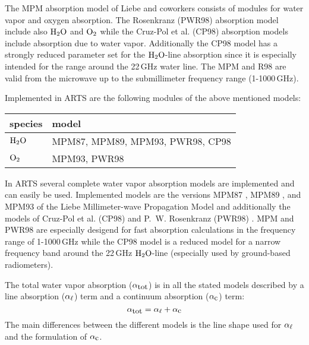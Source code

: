 {%



\label{levelb:CompAbsMod}
The MPM absorption model of Liebe and coworkers consists of modules for 
water vapor and oxygen absorption. The Rosenkranz (PWR98) absorption 
model include also $\mbox{H}_2\mbox{O}$ and $\mbox{O}_2$ while the Cruz-Pol et al. (CP98) absorption 
models include absorption due to water vapor. Additionally 
the CP98 model has a strongly reduced parameter set for the $\mbox{H}_2\mbox{O}$-line 
absorption since it is especially intended for the range around the 
22\,GHz water line. The MPM and R98 are valid from the microwave 
up to the submillimeter frequency range (1-1000\,GHz).

Implemented in ARTS are the following modules of the above mentioned models:
%
\begin{center}
\begin{tabular}{ll}
\hline
species & model\\
\hline
$\mbox{H}_2\mbox{O}$ & MPM87, MPM89, MPM93, PWR98, CP98 \\
$\mbox{O}_2$  & MPM93, PWR98 \\
\hline
\end{tabular}
\end{center}




\label{levelc:CompWatVapMod}
In ARTS several complete water vapor absorption models are implemented and 
can easily be used. Implemented models are the versions 
MPM87 \cite{liebeandlayton:87}, MPM89 \cite{liebe:89}, and 
MPM93 \cite{liebeetal:93} of the Liebe Millimeter-wave Propagation Model 
and additionally the models of Cruz-Pol et al. (CP98) \cite{cruzpol:98} 
and P.~W. Rosenkranz (PWR98) \cite{pwr:98}. 
MPM and PWR98 are especially desigend for fast absorption calculations in 
the frequency range of 1-1000\,GHz while the CP98 model is a reduced model 
for a narrow frequency band around the 22\,GHz $\mbox{H}_2\mbox{O}$-line (especially used 
by ground-based radiometers).

The total water vapor absorption ($\alpha_{\mbox{\rm \small tot}}$) is in all the stated models 
described by a line absorption ($\alpha_{\ell}$) term and a continuum absorption 
($\alpha_{\mbox{\small c}}$) term: 
\begin{equation}
  \label{eq:h2o:totabs}
  \alpha_{\mbox{\rm \small tot}} = \alpha_{\ell} + \alpha_{\mbox{\small c}}
\end{equation}
The main differences between the different models is the line shape used for 
$\alpha_{\ell}$ and the formulation of $\alpha_{\mbox{\small c}}$.

}
